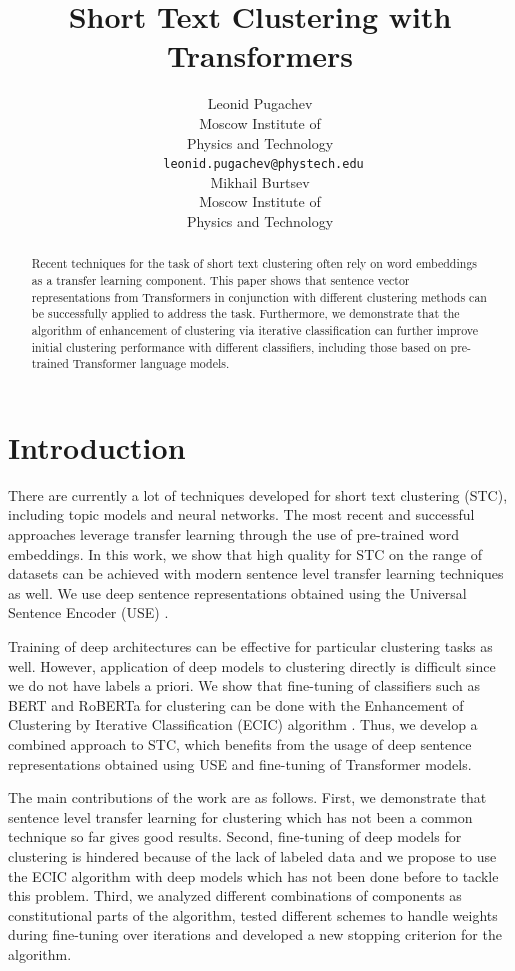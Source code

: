 \documentclass[11pt,a4paper]{article}
\title{Short Text Clustering with Transformers}
\author{Leonid Pugachev \\
  Moscow Institute of \\
  Physics and Technology \\\
  \texttt{leonid.pugachev@phystech.edu} \\\And
Mikhail Burtsev \\
  Moscow Institute of \\
  Physics and Technology \\}
\date{}
\begin{document}
\maketitle
\begin{abstract}
Recent techniques for the task of short text clustering often rely on word embeddings as a transfer learning component. This paper shows that sentence vector representations from  Transformers in conjunction with different clustering methods can be successfully applied to address the task. Furthermore, we demonstrate that the algorithm of enhancement of clustering via iterative classification can further improve initial clustering performance with different classifiers, including those based on pre-trained Transformer language models.

\end{abstract}

\section{Introduction}
There are currently a lot of techniques developed for short text clustering (STC), including topic models and neural networks. The most recent and successful approaches leverage transfer learning through the use of pre-trained word embeddings. In this work, we show that high quality for STC on the range of datasets can be achieved with modern sentence level transfer learning techniques as well. We use deep sentence representations obtained using the Universal Sentence Encoder (USE) \cite{DBLP:journals/corr/abs-1803-11175, DBLP:journals/corr/abs-1907-04307}.

Training of deep architectures can be effective for particular clustering tasks as well. However, application of deep models to clustering directly is difficult since we do not have labels a priori. We show that fine-tuning of classifiers such as BERT \cite{devlin2018bert} and RoBERTa \cite{liu2019roberta} for clustering can be done with the Enhancement of Clustering by Iterative Classification (ECIC) algorithm \cite{rakib2020enhancement}. Thus, we develop a combined approach to STC, which benefits from the usage of deep sentence representations obtained using USE and fine-tuning of Transformer models.

The main contributions of the work are as follows. First, we demonstrate that sentence level transfer learning for clustering which has not been a common technique so far gives good results. Second, fine-tuning of deep models for clustering is hindered because of the lack of labeled data and we propose to use the ECIC algorithm with deep models which has not been done before to tackle this problem. Third, we analyzed different combinations of components as constitutional parts of the algorithm, tested different schemes to handle weights during fine-tuning over iterations and developed a new stopping criterion for the algorithm.
\end{document}
